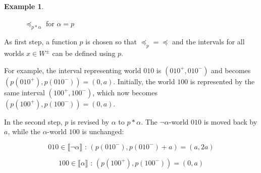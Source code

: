 \documentclass[english, 12pt]{scrartcl}
\theoremstyle{definition}
\newtheorem{example}{Example}
\theoremstyle{definition}
\theoremstyle{definition}
\newcommand{\modelsOf}[1]{\llbracket #1 \rrbracket}
\begin{document}
\begin{example}
\begin{figure}[H]
            \caption{$\preceq_{p \ast \alpha}$ for $\alpha = p$}
            \label{fig:example-preceq-revised}
    \end{figure}
    
    As first step, a function $p$ is chosen so that $\preceq_{p} = \preceq$ and the intervals for all worlds $x \in W^{\pm}$ can be defined using $p$.
    
    For example, the interval representing world $010$ is $(010^{+}, 010^{-})$ and becomes $(p(010^{+}), p(010^{-})) = (0, a)$. Initially, the world $100$ is represented by the same interval $(100^{+}, 100^{-})$, which now becomes $(p(100^{+}), p(100^{-})) = (0, a)$.
    
    \bigskip
    
    In the second step, $p$ is revised by $\alpha$ to $p \ast \alpha$. The $\neg\alpha$-world $010$ is moved back by $a$, while the $\alpha$-world $100$ is unchanged:
    
    \begin{equation*}
        010 \in \modelsOf{\neg\alpha} \textrm{ : } (p(010^{-}), p(010^{-}) + a) = (a, 2a)
    \end{equation*}
    
    \begin{equation*}
        100 \in \modelsOf{\alpha} \textrm{ : } (p(100^{+}), p(100^{-})) = (0, a)
    \end{equation*}
\end{example}
\end{document}
